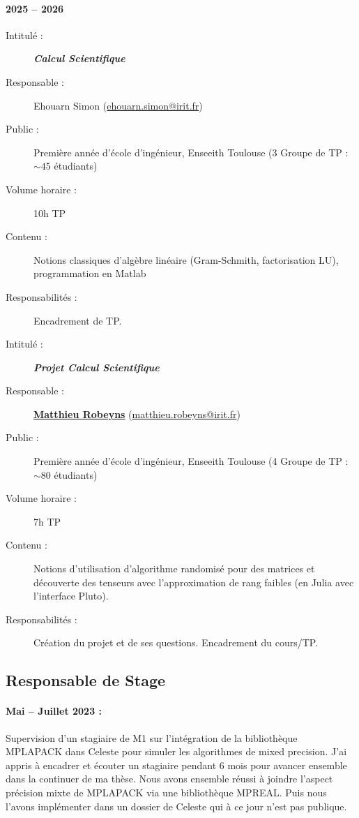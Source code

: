 \paragraph*{2025 -- 2026}
\begin{description}
      \item[Intitulé :] \textit{\textbf{Calcul Scientifique}}
      \item[Responsable :] Ehouarn Simon
            (\href{mailto:ehouarn.simon@irit.fr}{ehouarn.simon@irit.fr})
      \item[Public :] Première année d'école d'ingénieur, Enseeith Toulouse (3 Groupe de TP
            : $\sim 45$ étudiants)
      \item[Volume horaire :] 10h TP
      \item[Contenu :] Notions classiques d'algèbre linéaire (Gram-Schmith, factorisation
            LU), programmation en Matlab
      \item[Responsabilités :] Encadrement de TP.
\end{description}

\begin{description}
      \item[Intitulé :] \textit{\textbf{Projet Calcul Scientifique}}
      \item[Responsable :] \underline{\textbf{Matthieu Robeyns}}
            (\href{mailto:matthieu.robeyns@irit.fr}{matthieu.robeyns@irit.fr})
      \item[Public :] Première année d'école d'ingénieur, Enseeith Toulouse (4 Groupe de TP
            : $\sim 80$ étudiants)
      \item[Volume horaire :] 7h TP
      \item[Contenu :] Notions d'utilisation d'algorithme randomisé pour des matrices et
            découverte des tenseurs avec l'approximation de rang faibles (en Julia avec
            l'interface Pluto).
      \item[Responsabilités :] Création du projet et de ses questions. Encadrement du
            cours/TP.
\end{description}

\subsection{Responsable de Stage}

\paragraph*{Mai -- Juillet 2023 :}
Supervision d'un stagiaire de M1 sur l'intégration de la bibliothèque MPLAPACK dans Celeste pour simuler les algorithmes de mixed precision.
J'ai appris à encadrer et écouter un stagiaire pendant 6 mois pour avancer ensemble dans la continuer de ma thèse.
Nous avons ensemble réussi à joindre l'aspect précision mixte de MPLAPACK via une bibliothèque MPREAL.
Puis nous l'avons implémenter dans un dossier de Celeste qui à ce jour n'est pas publique.
\normalsize

